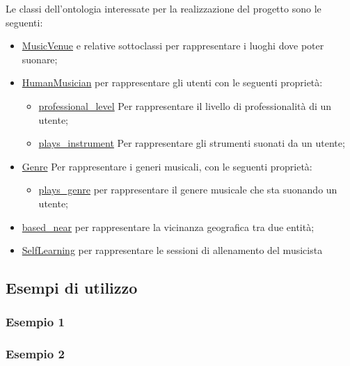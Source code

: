 \documentclass[12pt, a4paper]{article}
\begin{document}
Le classi dell'ontologia interessate per la realizzazione del progetto sono le seguenti:
\begin{itemize}
    \item \href{https://schema.org/MusicVenue}{MusicVenue} e relative sottoclassi per rappresentare i luoghi dove poter suonare;
    \item \href{http://purl.org/ontology/musico#HumanMusician}{HumanMusician} per rappresentare gli utenti con le seguenti proprietà:
          \begin{itemize}
              \item  \href{http://purl.org/ontology/musico#professional_level}{professional\_level} Per rappresentare il livello di professionalità di un utente;
              \item \href{http://purl.org/ontology/musico#plays_instrument}{plays\_instrument} Per rappresentare gli strumenti suonati da un utente;
          \end{itemize}
    \item \href{http://purl.org/ontology/mo/Genre}{Genre} Per rappresentare i generi musicali, con le seguenti proprietà:
          \begin{itemize}
              \item \href{http://purl.org/ontology/musico\#plays\_genre}{plays\_genre} per rappresentare il genere musicale che sta suonando un utente;
          \end{itemize}
    \item \href{http://xmlns.com/foaf/0.1/based_near}{based\_near} per rappresentare la vicinanza geografica tra due entità;
    \item \href{http://purl.org/ontology/musico/SelfLearning}{SelfLearning} per rappresentare le sessioni di allenamento del musicista
\end{itemize}

\subsection{Esempi di utilizzo}

\subsubsection{Esempio 1 }




\subsubsection{Esempio 2 }
\end{document}
